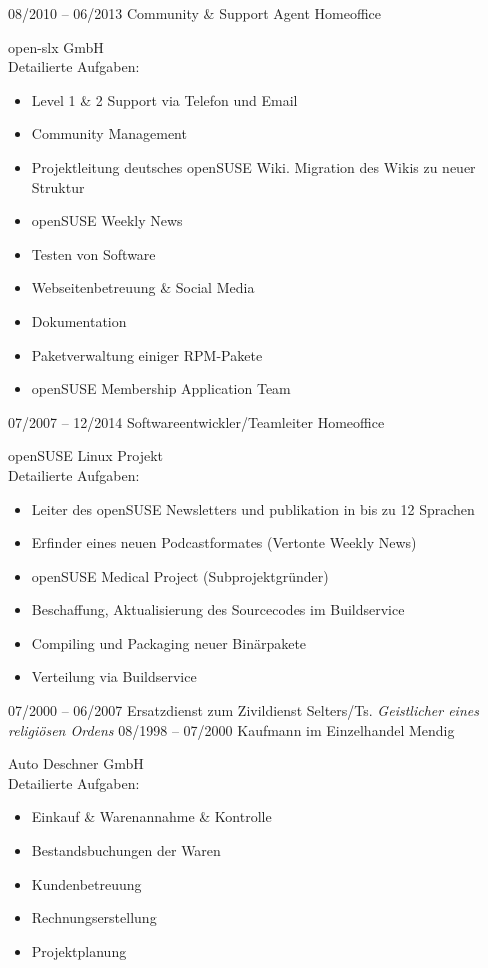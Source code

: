 \documentclass[a4paper]{friggeri-cv} %
\begin{document}
\begin{entrylist}
\entry
{08/2010 -- 06/2013}
{Community \& Support Agent}
{Homeoffice}
{open-slx GmbH \\
    Detailierte Aufgaben:
    \begin{itemize}
        \item Level 1 \& 2 Support via Telefon und Email
        \item Community Management
        \item Projektleitung deutsches openSUSE Wiki. Migration des Wikis zu neuer Struktur
        \item openSUSE Weekly News
        \item Testen von Software
        \item Webseitenbetreuung \& Social Media
        \item Dokumentation
        \item Paketverwaltung einiger RPM-Pakete
        \item openSUSE Membership Application Team
    \end{itemize}
}
\entry
{07/2007 -- 12/2014}
{Softwareentwickler/Teamleiter}
{Homeoffice}
{openSUSE Linux Projekt\\
    Detailierte Aufgaben:
    \begin{itemize}
        \item Leiter des openSUSE Newsletters und publikation in bis zu 12 Sprachen
        \item Erfinder eines neuen Podcastformates (Vertonte Weekly News)
        \item openSUSE Medical Project (Subprojektgründer)
        \item Beschaffung, Aktualisierung des Sourcecodes im Buildservice
        \item Compiling und Packaging neuer Binärpakete
        \item Verteilung via Buildservice
    \end{itemize}
}
\entry
{07/2000 -- 06/2007}
{Ersatzdienst zum Zivildienst}
{Selters/Ts.}
{\emph{Geistlicher eines religiösen Ordens}}
\entry
{08/1998 -- 07/2000}
{Kaufmann im Einzelhandel}
{Mendig}
{Auto Deschner GmbH\\
    Detailierte Aufgaben:
    \begin{itemize}
        \item Einkauf \& Warenannahme \& Kontrolle
        \item Bestandsbuchungen der Waren
        \item Kundenbetreuung
        \item Rechnungserstellung
        \item Projektplanung
    \end{itemize}
}
\end{entrylist}
\end{document}
